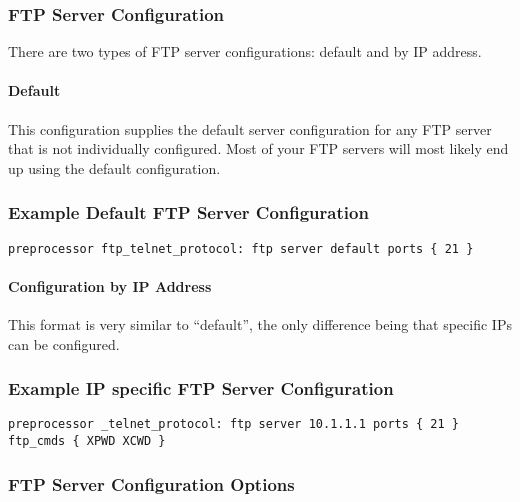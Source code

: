 \documentclass[english]{report}
\begin{document}
\subsubsection{FTP Server Configuration}

There are two types of FTP server configurations: default and by IP address.

\paragraph{Default}

This configuration supplies the default server configuration for any FTP server
that is not individually configured.  Most of your FTP servers will most
likely end up using the default configuration.

\subsubsection{Example Default FTP Server Configuration}
\begin{verbatim}
preprocessor ftp_telnet_protocol: ftp server default ports { 21 } 
\end{verbatim}

\paragraph{Configuration by IP Address}
This format is very similar to ``default'', the only difference being that
specific IPs can be configured.

\subsubsection{Example IP specific FTP Server Configuration}
\begin{verbatim}
preprocessor _telnet_protocol: ftp server 10.1.1.1 ports { 21 } ftp_cmds { XPWD XCWD }
\end{verbatim}

\subsubsection{FTP Server Configuration Options}
\end{document}
